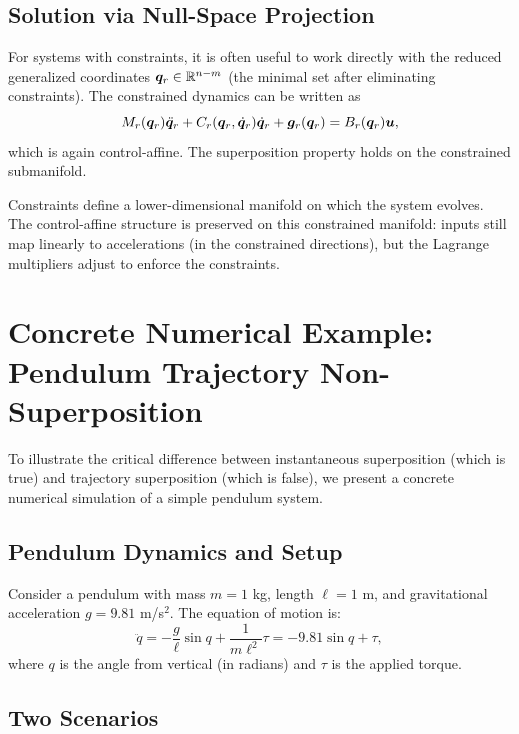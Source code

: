 \subsection{Solution via Null-Space Projection}

For systems with constraints, it is often useful to work directly with the reduced generalized
coordinates $\bm{q}_r \in \mathbb{R}^{n-m}$ (the minimal set after eliminating constraints). The
constrained dynamics can be written as
\begin{equation}
M_r(\bm{q}_r)\ddot{\bm{q}}_r + C_r(\bm{q}_r,\dot{\bm{q}}_r)\dot{\bm{q}}_r + \bm{g}_r(\bm{q}_r) = B_r(\bm{q}_r)\bm{u},
\label{eq:ch3:reduced-dynamics}
\end{equation}
which is again control-affine. The superposition property holds on the constrained submanifold.

\begin{intuitionbox}
Constraints define a lower-dimensional manifold on which the system evolves. The
control-affine structure is preserved on this constrained manifold: inputs still map linearly
to accelerations (in the constrained directions), but the Lagrange multipliers adjust to
enforce the constraints.
\end{intuitionbox}


\section{Concrete Numerical Example: Pendulum Trajectory Non-Superposition}

To illustrate the critical difference between instantaneous superposition (which is true) and
trajectory superposition (which is false), we present a concrete numerical simulation of a
simple pendulum system.

\subsection{Pendulum Dynamics and Setup}

Consider a pendulum with mass $m = 1$ kg, length $\ell = 1$ m, and gravitational acceleration
$g = 9.81$ m/s$^2$. The equation of motion is:
\begin{equation}
\ddot q = -\frac{g}{\ell}\sin q + \frac{1}{m\ell^2}\tau
= -9.81\sin q + \tau,
\label{eq:ch3:pendulum-numerical}
\end{equation}
where $q$ is the angle from vertical (in radians) and $\tau$ is the applied torque.

\subsection{Two Scenarios}

